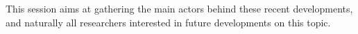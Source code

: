 \documentclass[12pt,english]{article}
\begin{document}
This session aims at gathering the main actors behind these recent
developments, and naturally all researchers interested in future developments
on this topic.





\end{document}
